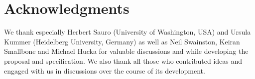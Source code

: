 
\section{Acknowledgments}

We thank especially Herbert Sauro (University of Washington, USA) and Ursula Kummer (Heidelberg University, Germany) as well as Neil
Swainston, Keiran Smallbone and Michael Hucka for valuable discussions and while developing the \FBCPackage proposal and specification.  We also thank all those who contributed ideas and engaged with us in discussions over the course of its development.

